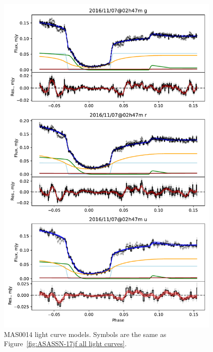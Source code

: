 \begin{figure}
    \centering
    \includegraphics[width=\textwidth]{figures/results/MASOT0014/MASOT0014_1.pdf}
    \caption{MAS0014 light curve models. Symbols are the same as Figure~\ref{fig:ASASSN-17jf all light curves}.}
    \label{fig:MAS0014 all light curves}
\end{figure}

